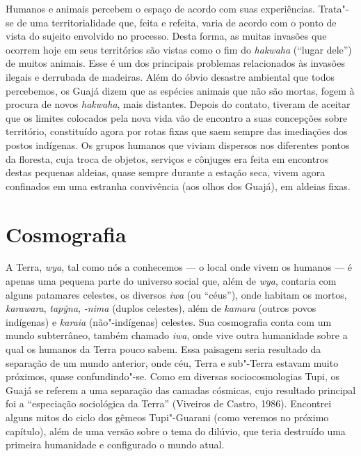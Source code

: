 Humanos e animais percebem o espaço de acordo com suas experiências.
Trata"-se de uma territorialidade que, feita e refeita, varia de acordo
com o ponto de vista do sujeito envolvido no processo. Desta forma, as
muitas invasões que ocorrem hoje em seus territórios são vistas como o
fim do \emph{hakwaha} (``lugar dele'') de muitos animais. Esse é um dos
principais problemas relacionados às invasões ilegais e derrubada de
madeiras. Além do óbvio desastre ambiental que todos percebemos, os
Guajá dizem que as espécies animais que não são mortas, fogem à procura
de novos \emph{hakwaha}, mais distantes. Depois do contato, tiveram de
aceitar que os limites colocados pela nova vida vão de encontro a suas
concepções sobre território, constituído agora por rotas fixas que saem
sempre das imediações dos postos indígenas. Os grupos humanos que viviam
dispersos nos diferentes pontos da floresta, cuja troca de objetos,
serviços e cônjuges era feita em encontros destas pequenas aldeias,
quase sempre durante a estação seca, vivem agora confinados em uma
estranha convivência (aos olhos dos Guajá), em aldeias fixas.

\section{Cosmografia}\label{cosmografia}

A Terra, \emph{wya,} tal como nós a conhecemos --- o local onde vivem os
humanos --- é apenas uma pequena parte do universo social que, além de
\emph{wya}, contaria com alguns patamares celestes, os diversos
\emph{iwa} (ou ``céus''), onde habitam os mortos, \emph{karawara},
\emph{tapỹna}, \emph{-nima} (duplos celestes), além de \emph{kamara}
(outros povos indígenas) e \emph{karaia} (não"-indígenas) celestes. Sua
cosmografia conta com um mundo subterrâneo, também chamado \emph{iwa},
onde vive outra humanidade sobre a qual os humanos da Terra pouco sabem.
Essa paisagem seria resultado da separação de um mundo anterior, onde
céu, Terra e sub"-Terra estavam muito próximos, quase confundindo"-se.
Como em diversas sociocosmologias Tupi, os Guajá se referem a uma
separação das camadas cósmicas, cujo resultado principal foi a
``especiação sociológica da Terra'' (Viveiros de Castro, 1986).
Encontrei alguns mitos do ciclo dos gêmeos Tupi"-Guarani (como veremos no
próximo capítulo), além de uma versão sobre o tema do dilúvio, que teria
destruído uma primeira humanidade e configurado o mundo atual.

